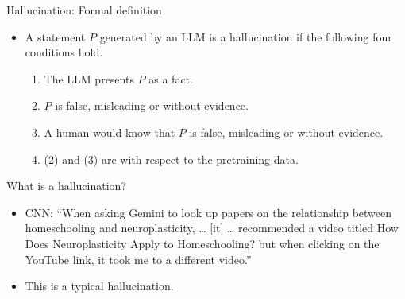                     

\begin{vbframe}{Hallucination: Formal definition}

\vfill


	\begin{itemize}
		\item
A statement $P$ generated by an LLM is a hallucination if
the following four conditions hold.
\begin{enumerate}
                    \item  The LLM presents $P$ as a fact.
    \item  $P$ is false, misleading or without evidence.
        \item  A human would know that $P$ is false, misleading or
            without evidence.
                \item (2) and (3) are with respect to the
                pretraining data.
	\end{enumerate}
	\end{itemize}

\vfill

\end{vbframe}


\begin{vbframe}{What is a hallucination?}

\vfill


	\begin{itemize}

\item
CNN: ``When asking Gemini to look up papers on the relationship
between homeschooling and neuroplasticity, \ldots
[it] \ldots
recommended a video titled How Does
Neuroplasticity Apply to Homeschooling? but when clicking on
the YouTube link, it took me to a different video.''

\item This is a typical hallucination.
\end{itemize}

\vfill

\end{vbframe}

